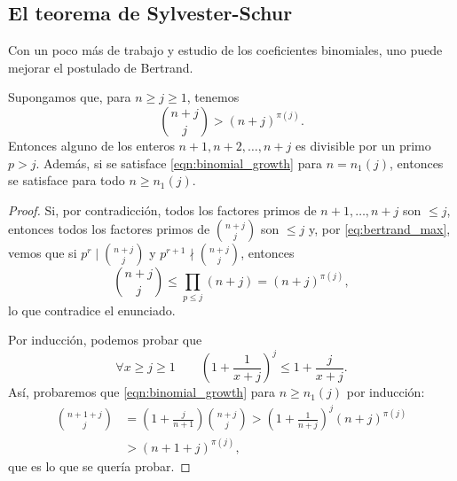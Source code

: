 \documentclass[teoria-numeros.tex]{subfiles}
\begin{document}

\subsection{El teorema de Sylvester-Schur}
Con un poco más de trabajo y estudio de los coeficientes binomiales, uno puede mejorar el postulado de Bertrand.
\begin{lem}
	Supongamos que, para $n \ge j \ge 1$, tenemos
	\begin{equation}
		\binom{n + j}{j} > (n + j)^{\pi(j)}.
		\label{eqn:binomial_growth}
	\end{equation}
	Entonces alguno de los enteros $n + 1, n + 2, \dots, n + j$ es divisible por un primo $p > j$.
	Además, si se satisface \eqref{eqn:binomial_growth} para $n = n_1(j)$, entonces se satisface para todo $n \ge n_1(j)$.
\end{lem}
\begin{proof}
	Si, por contradicción, todos los factores primos de $n + 1, \dots, n + j$ son $\le j$, entonces todos los factores primos de $\binom{n + j}{j}$
	son $\le j$ y, por \eqref{eq:bertrand_max}, vemos que si $p^r \mid \binom{n + j}{j}$ y $p^{r+1} \nmid \binom{n + j}{j}$, entonces
	$$ \binom{n + j}{j} \le \prod_{p \le j} (n + j) = (n + j)^{\pi(j)}, $$
	lo que contradice el enunciado.

	Por inducción, podemos probar que
	$$ \forall x\ge j\ge 1 \qquad \left( 1 + \frac{1}{x + j} \right)^j \le 1 + \frac{j}{x + j}. $$
	Así, probaremos que \eqref{eqn:binomial_growth} para $n \ge n_1(j)$ por inducción:
	\begin{align*}
		\binom{n + 1 + j}{j} &= \left( 1 + \frac{j}{n + 1} \right) \binom{n + j}{j} > \left( 1 + \frac{1}{n + j} \right)^j (n + j)^{\pi(j)} \\
				     &> (n + 1 + j)^{\pi(j)},
	\end{align*}
	que es lo que se quería probar.
\end{proof}
\end{document}
